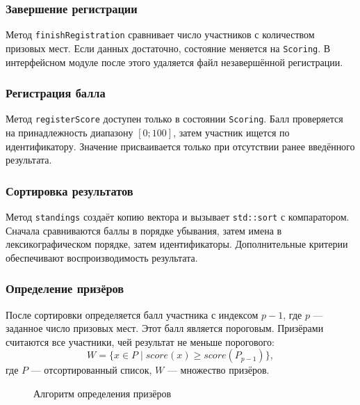 \documentclass[14pt,a4paper]{extarticle}
\newcommand{\code}[1]{\texttt{#1}}
\begin{document}
\subsubsection{Завершение регистрации}

Метод \code{finishRegistration} сравнивает число участников с количеством призовых мест. Если данных достаточно, состояние меняется на \code{Scoring}. В интерфейсном модуле после этого удаляется файл незавершённой регистрации.

\subsubsection{Регистрация балла}

Метод \code{registerScore} доступен только в состоянии \code{Scoring}. Балл проверяется на принадлежность диапазону $[0;100]$, затем участник ищется по идентификатору. Значение присваивается только при отсутствии ранее введённого результата.

\subsubsection{Сортировка результатов}

Метод \code{standings} создаёт копию вектора и вызывает \code{std::sort} с компаратором. Сначала сравниваются баллы в порядке убывания, затем имена в лексикографическом порядке, затем идентификаторы. Дополнительные критерии обеспечивают воспроизводимость результата.

\subsubsection{Определение призёров}

После сортировки определяется балл участника с индексом $p-1$, где $p$ --- заданное число призовых мест. Этот балл является пороговым. Призёрами считаются все участники, чей результат не меньше порогового:
\[
W = \{x \in P \mid score(x) \geq score(P_{p-1})\},
\]
где $P$ --- отсортированный список, $W$ --- множество призёров.

\begin{figure}[H]
\centering
{}
\caption{Алгоритм определения призёров}
\label{fig:winners}
\end{figure}
\end{document}
